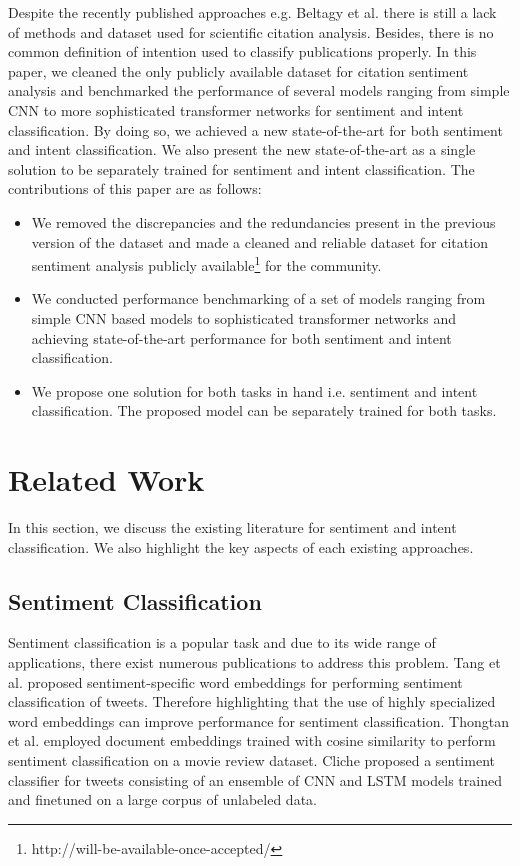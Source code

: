\documentclass[runningheads]{llncs}
\begin{document}
Despite the recently published approaches e.g. Beltagy et al. \cite{beltagy2019scibert} there is still a lack of methods and dataset used for scientific citation analysis. Besides, there is no common definition of intention used to classify publications properly. In this paper, we cleaned the only publicly available dataset for citation sentiment analysis and benchmarked the performance of several models ranging from simple CNN to more sophisticated transformer networks for sentiment and intent classification. By doing so, we achieved a new state-of-the-art for both sentiment and intent classification. We also present the new state-of-the-art as a single solution to be separately trained for sentiment and intent classification. The contributions of this paper are as follows:
\begin{itemize}
    \item We removed the discrepancies and the redundancies present in the previous version of the dataset and made a cleaned and reliable dataset for citation sentiment analysis publicly available\footnote{http://will-be-available-once-accepted/} for the community. 
    \item We conducted performance benchmarking of a set of models ranging from simple CNN based models to sophisticated transformer networks and achieving state-of-the-art performance for both sentiment and intent classification.
    \item We propose one solution for both tasks in hand i.e. sentiment and intent classification. The proposed model can be separately trained for both tasks.
\end{itemize}

\section{Related Work}
In this section, we discuss the existing literature for sentiment and intent classification. We also highlight the key aspects of each existing approaches.

\subsection{Sentiment Classification}
Sentiment classification is a popular task and due to its wide range of applications, there exist numerous publications to address this problem. Tang et al. \cite{tang2014learning} proposed sentiment-specific word embeddings for performing sentiment classification of tweets. Therefore highlighting that the use of highly specialized word embeddings can improve performance for sentiment classification. Thongtan et al. \cite{thongtan-phienthrakul-2019-sentiment} employed document embeddings trained with cosine similarity to perform sentiment classification on a movie review dataset. Cliche \cite{cliche-2017-bb} proposed a sentiment classifier for tweets consisting of an ensemble of CNN and LSTM models trained and finetuned on a large corpus of unlabeled data. 
\end{document}
